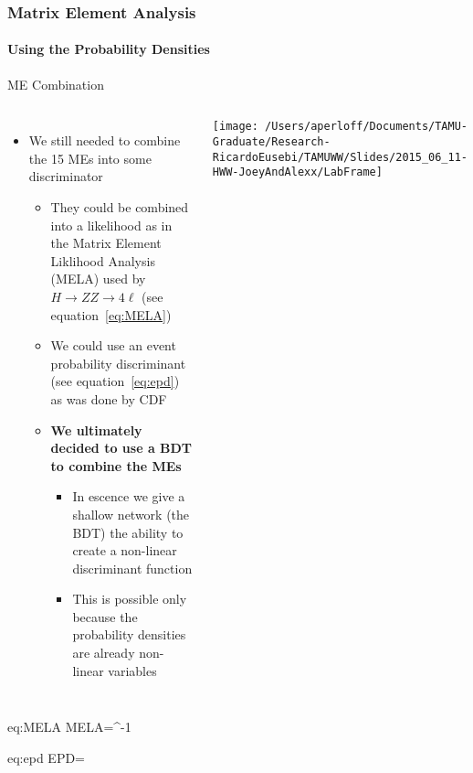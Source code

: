 \begin{frame}
	\frametitle{Matrix Element Analysis}
	\framesubtitle{Using the Probability Densities}
	\vspace*{-0.24cm}

	\begin{block}{ME Combination}
		\begin{columns}[T]
			\begin{itemize}
				\item We still needed to combine the 15 MEs into some discriminator
				\begin{itemize}
					\item They could be combined into a likelihood as in the Matrix Element Liklihood Analysis (MELA) used by $H{\rightarrow}ZZ{\rightarrow}4\ell$ (see equation~\ref{eq:MELA})
					\item We could use an event probability discriminant (see equation~\ref{eq:epd}) as was done by CDF
					\item \textbf{We ultimately decided to use a BDT to combine the MEs}
					\begin{itemize}
						\item In escence we give a shallow network (the BDT) the ability to create a non-linear discriminant function
						\item This is possible only because the probability densities are already non-linear variables
					\end{itemize}
				\end{itemize}
			\end{itemize}
			\vspace*{0.7cm}
			\texttt{[image: /Users/aperloff/Documents/TAMU-Graduate/Research-RicardoEusebi/TAMUWW/Slides/2015\_06\_11-HWW-JoeyAndAlexx/LabFrame]}%
		\end{columns}
		\begin{aeq}{eq:MELA}
MELA=^{-1}
		\end{aeq}
		\begin{aeq}{eq:epd}
EPD=
		\end{aeq}
	\end{block}
\end{frame}

